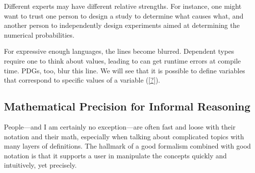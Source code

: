 Different experts may have different relative strengths.
For instance, one might want to trust one person to design a study to determine what causes what, and another person to independently design experiments aimed at determining the numerical probabilities. 


For expressive enough languages, the lines become blurred. 
Dependent types require one to think about values, leading to can get runtime errors at compile time. 
PDGs, too, blur this line.  We will see that it is possible to define variables that correspond to specific values of a variable (\cref{?}).

%


\subsection{Mathematical Precision for Informal Reasoning}
People---and I am certainly no exception---are often fast and loose with their notation and their math, especially when talking about complicated topics with many layers of definitions. 
%
The hallmark of a good formalism combined with good notation is that it supports a user in manipulate the concepts quickly and intuitively, yet precisely.
    
